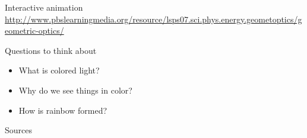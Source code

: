 \begin{frame}{Interactive animation}
  \url{http://www.pbslearningmedia.org/resource/lsps07.sci.phys.energy.geometoptics/geometric-optics/}
\end{frame}

\newcommand{\includevideo}[1]{
    \includemedia[label=#1,
      width=\linewidth,height=0.6\linewidth, %
      activate=pageopen,
      addresource=media/#1.mp4,
      flashvars={
        source=media/#1.mp4
        &loop=false             %
        &scaleMode=letterbox   %
      }
    ]{}{VPlayer.swf}
}

\begin{frame}{Questions to think about}
  \begin{itemize}
    \item What is colored light?
    \item Why do we see things in color?
    \item How is rainbow formed?
  \end{itemize}
\end{frame}
\begin{frame}{Sources}
\nocite{bbc2006light}
\nocite{wilk2008eye}

\end{frame}


